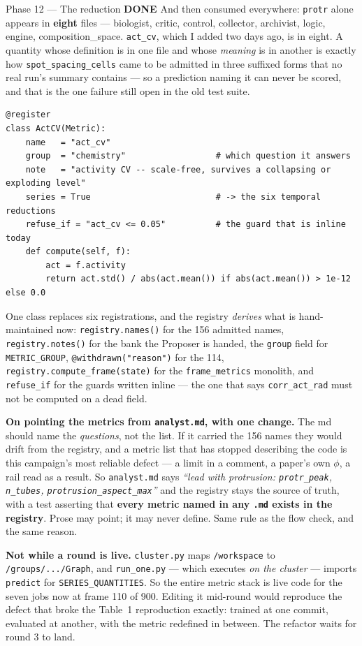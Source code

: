 \documentclass[11pt,a4paper]{article}
\newcommand{\code}[1]{\texttt{#1}}
\newcommand{\done}{\textcolor{good}{\textbf{DONE}}}
\begin{document}
\begin{phasebox}{Phase 12 --- The reduction \hfill \done}
\noindent And then consumed everywhere: \code{protr} alone appears in \textbf{eight} files ---
biologist, critic, control, collector, archivist, logic, engine, composition\_space. \code{act\_cv},
which I added two days ago, is in eight. A quantity whose definition is in one file and whose
\emph{meaning} is in another is exactly how \code{spot\_spacing\_cells} came to be admitted in three
suffixed forms that no real run's summary contains --- so a prediction naming it can never be scored,
and that is the one failure still open in the old test suite.

\begin{verbatim}
@register
class ActCV(Metric):
    name   = "act_cv"
    group  = "chemistry"                  # which question it answers
    note   = "activity CV -- scale-free, survives a collapsing or exploding level"
    series = True                         # -> the six temporal reductions
    refuse_if = "act_cv <= 0.05"          # the guard that is inline today
    def compute(self, f):
        act = f.activity
        return act.std() / abs(act.mean()) if abs(act.mean()) > 1e-12 else 0.0
\end{verbatim}

\noindent One class replaces six registrations, and the registry \emph{derives} what is
hand-maintained now: \code{registry.names()} for the 156 admitted names,
\code{registry.notes()} for the bank the Proposer is handed, the \code{group} field for
\code{METRIC\_GROUP}, \code{@withdrawn("reason")} for the 114, \code{registry.compute\_frame(state)}
for the \code{frame\_metrics} monolith, and \code{refuse\_if} for the guards written inline --- the
one that says \code{corr\_act\_rad} must not be computed on a dead field.

\textbf{On pointing the metrics from \code{analyst.md}, with one change.} The md should name the
\emph{questions}, not the list. If it carried the 156 names they would drift from the registry, and a
metric list that has stopped describing the code is this campaign's most reliable defect --- a limit
in a comment, a paper's own $\phi$, a rail read as a result. So \code{analyst.md} says \emph{``lead
with protrusion: \code{protr\_peak}, \code{n\_tubes}, \code{protrusion\_aspect\_max}''} and the
registry stays the source of truth, with a test asserting that \textbf{every metric named in any
\code{.md} exists in the registry}. Prose may point; it may never define. Same rule as the flow
check, and the same reason.

\textbf{Not while a round is live.} \code{cluster.py} maps \code{/workspace} to
\code{/groups/.../Graph}, and \code{run\_one.py} --- which executes \emph{on the cluster} --- imports
\code{predict} for \code{SERIES\_QUANTITIES}. So the entire metric stack is live code for the seven
jobs now at frame 110 of 900. Editing it mid-round would reproduce the defect that broke the Table~1
reproduction exactly: trained at one commit, evaluated at another, with the metric redefined in
between. The refactor waits for round 3 to land.


\end{phasebox}
\end{document}
